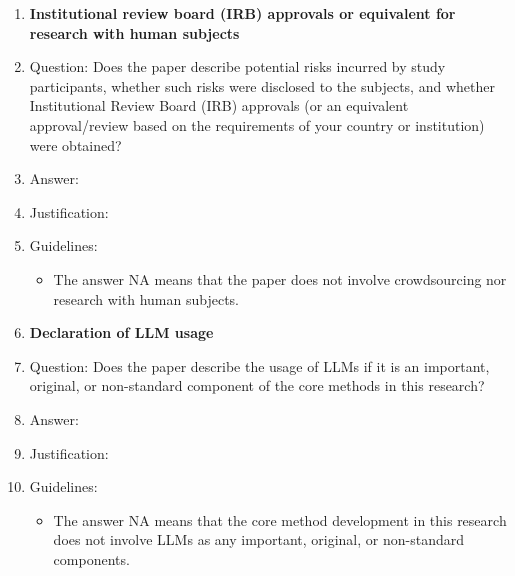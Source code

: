 \documentclass{article}
\begin{document}
\begin{enumerate}
\item {\bf Institutional review board (IRB) approvals or equivalent for research with human subjects}
    \item[] Question: Does the paper describe potential risks incurred by study participants, whether such risks were disclosed to the subjects, and whether Institutional Review Board (IRB) approvals (or an equivalent approval/review based on the requirements of your country or institution) were obtained?
    \item[] Answer: \answerTODO{}
    \item[] Justification: \justificationTODO{}
    \item[] Guidelines:
    \begin{itemize}
        \item The answer NA means that the paper does not involve crowdsourcing nor research with human subjects.
    \end{itemize}

\item {\bf Declaration of LLM usage}
    \item[] Question: Does the paper describe the usage of LLMs if it is an important, original, or non-standard component of the core methods in this research?
    \item[] Answer: \answerTODO{}
    \item[] Justification: \justificationTODO{}
    \item[] Guidelines:
    \begin{itemize}
        \item The answer NA means that the core method development in this research does not involve LLMs as any important, original, or non-standard components.
    \end{itemize}

\end{enumerate}
\end{document}
